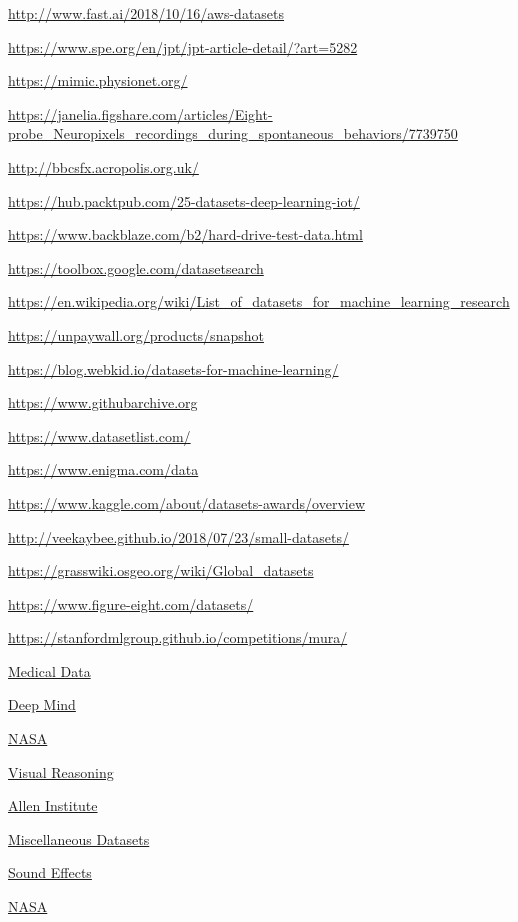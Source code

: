 \documentclass[]{book}
\begin{document}
\url{http://www.fast.ai/2018/10/16/aws-datasets}

\url{https://www.spe.org/en/jpt/jpt-article-detail/?art=5282}

\url{https://mimic.physionet.org/}

\url{https://janelia.figshare.com/articles/Eight-probe_Neuropixels_recordings_during_spontaneous_behaviors/7739750}

\url{http://bbcsfx.acropolis.org.uk/}

\url{https://hub.packtpub.com/25-datasets-deep-learning-iot/}

\url{https://www.backblaze.com/b2/hard-drive-test-data.html}

\url{https://toolbox.google.com/datasetsearch}

\url{https://en.wikipedia.org/wiki/List_of_datasets_for_machine_learning_research}

\url{https://unpaywall.org/products/snapshot}

\url{https://blog.webkid.io/datasets-for-machine-learning/}

\url{https://www.githubarchive.org}

\url{https://www.datasetlist.com/}

\url{https://www.enigma.com/data}

\url{https://www.kaggle.com/about/datasets-awards/overview}

\url{http://veekaybee.github.io/2018/07/23/small-datasets/}

\url{https://grasswiki.osgeo.org/wiki/Global_datasets}

\url{https://www.figure-eight.com/datasets/}

\url{https://stanfordmlgroup.github.io/competitions/mura/}

\href{https://github.com/beamandrew/medical-data}{Medical Data}

\href{https://deepmind.com/research/open-source/open-source-datasets/}{Deep
Mind}

\href{https://bmtgoncalves.github.io/pyNASA/}{NASA}

\href{http://lic.nlp.cornell.edu/nlvr/}{Visual Reasoning}

\href{http://allenai.org/data.html}{Allen Institute}

\href{http://users.stat.ufl.edu/~winner/datasets.html}{Miscellaneous
Datasets}

\href{http://bbcsfx.acropolis.org.uk/}{Sound Effects}

\href{https://open.nasa.gov/blog/}{NASA}
\end{document}
